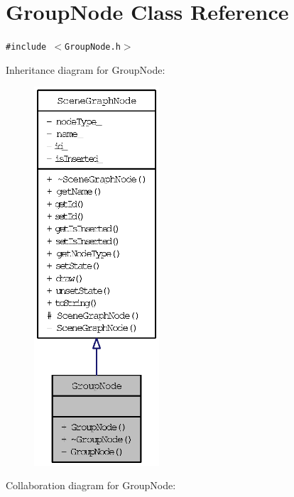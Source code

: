 \section{GroupNode Class Reference}
\label{classGroupNode}
{\tt \#include $<$GroupNode.h$>$}

Inheritance diagram for GroupNode:\nopagebreak
\begin{figure}[H]
\begin{center}
\leavevmode
\includegraphics[height=400pt]{classGroupNode__inherit__graph}
\end{center}
\end{figure}
Collaboration diagram for GroupNode:\nopagebreak
